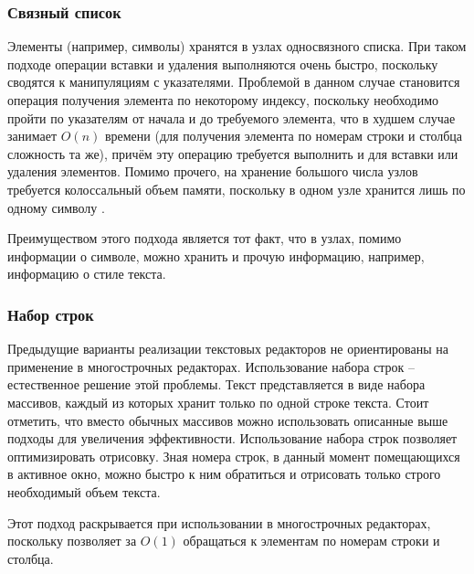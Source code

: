 \documentclass{fefu}
\begin{document}
			\subsubsection{Связный список}
				\par Элементы (например, символы) хранятся в узлах односвязного списка. При 
				таком подходе операции вставки и удаления выполняются очень быстро, поскольку 
				сводятся к манипуляциям с указателями. Проблемой в данном случае становится 
				операция получения элемента по некоторому индексу, поскольку необходимо пройти 
				по указателям от начала и до требуемого элемента, что в худшем случае занимает 
				$O(n)$ времени (для получения элемента по номерам строки и столбца сложность та
				же), причём эту операцию требуется выполнить и для вставки или удаления 
				элементов. Помимо прочего, на хранение большого числа узлов требуется 
				колоссальный объем памяти, поскольку в одном узле хранится лишь по одному 
				символу \cite{LinkedListReference}. 
				\par Преимуществом этого подхода является тот факт, что в узлах, помимо
				информации о символе, можно хранить и прочую информацию, например, информацию
				о стиле текста.
			\subsubsection{Набор строк}
				\par Предыдущие варианты реализации текстовых редакторов не ориентированы на
				применение в многострочных редакторах. Использование набора строк --
				естественное решение этой проблемы. Текст представляется в виде набора
				массивов, каждый из которых хранит только по одной строке текста. Стоит
				отметить, что вместо обычных массивов можно использовать описанные выше
				подходы для увеличения эффективности. Использование набора строк позволяет
				оптимизировать отрисовку. Зная номера строк, в данный момент помещающихся в 
				активное окно, можно быстро к ним обратиться и отрисовать только строго
				необходимый объем текста. 
				\par Этот подход раскрывается при использовании в многострочных редакторах,
				поскольку позволяет за $O(1)$ обращаться к элементам по номерам строки и
				столбца.
\end{document}
